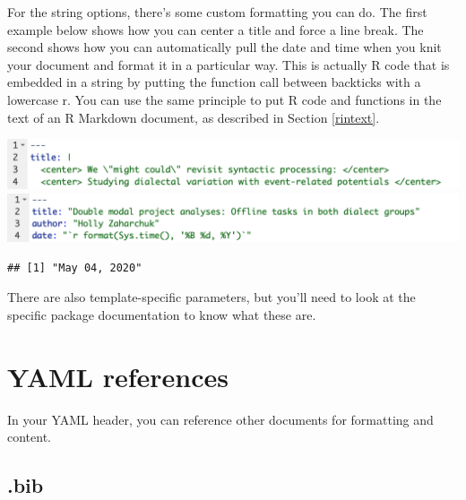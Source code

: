 \documentclass[
  openany]{book}
\newenvironment{Shaded}{\begin{snugshade}}{\end{snugshade}}
\newcommand{\CommentTok}[1]{\textcolor[rgb]{0.56,0.35,0.01}{\textit{#1}}}
\newcommand{\KeywordTok}[1]{\textcolor[rgb]{0.13,0.29,0.53}{\textbf{#1}}}
\newcommand{\NormalTok}[1]{#1}
\newcommand{\StringTok}[1]{\textcolor[rgb]{0.31,0.60,0.02}{#1}}
\begin{document}
For the string options, there's some custom formatting you can do. The first example below shows how you can center a title and force a line break. The second shows how you can automatically pull the date and time when you knit your document and format it in a particular way. This is actually R code that is embedded in a string by putting the function call between backticks with a lowercase r. You can use the same principle to put R code and functions in the text of an R Markdown document, as described in Section \ref{rintext}.

\includegraphics[width=\textwidth]{images/formatting_title}
\includegraphics[width=\textwidth]{images/formatting_date}

\begin{Shaded}
\end{Shaded}

\begin{verbatim}
## [1] "May 04, 2020"
\end{verbatim}

There are also template-specific parameters, but you'll need to look at the specific package documentation to know what these are.

\hypertarget{yamlref}{%
\section{YAML references}\label{yamlref}}

In your YAML header, you can reference other documents for formatting and content.

\hypertarget{bib}{%
\subsection{.bib}\label{bib}}
\end{document}
